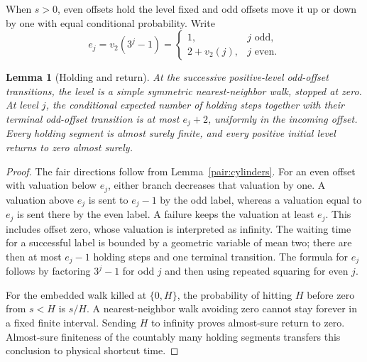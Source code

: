 \documentclass[11pt]{amsart}
\newtheorem{lemma}[theorem]{Lemma}
\theoremstyle{definition}
\theoremstyle{remark}
\begin{document}
When $s>0$, even offsets hold the level fixed and odd offsets move it up or
down by one with equal conditional probability.  Write
\begin{equation}\label{pair:valuation}
 e_j=v_2(3^j-1)=
 \begin{cases}1,&j\text{ odd},\\2+v_2(j),&j\text{ even}.
 \end{cases}
\end{equation}

\begin{lemma}[Holding and return]\label{pair:holding}
At the successive positive-level odd-offset transitions, the level is a
simple symmetric nearest-neighbor walk, stopped at zero.  At level $j$,
the conditional expected number of holding steps together with their
terminal odd-offset transition is at most $e_j+2$, uniformly in the
incoming offset.  Every holding segment is almost surely finite, and every
positive initial level returns to zero almost surely.
\end{lemma}
\begin{proof}
The fair directions follow from Lemma~\ref{pair:cylinders}.  For an even
offset with valuation below $e_j$, either branch decreases that valuation
by one.  A valuation above $e_j$ is sent to $e_j-1$ by the odd label,
whereas a valuation equal to $e_j$ is sent there by the even label.  A
failure keeps the valuation at least $e_j$.  This includes offset zero,
whose valuation is interpreted as infinity.  The waiting time for a
successful label is bounded by a geometric variable of mean two; there
are then at most $e_j-1$ holding steps and one terminal transition.
The formula for $e_j$ follows by factoring $3^j-1$ for odd $j$ and then
using repeated squaring for even $j$.

For the embedded walk killed at $\{0,H\}$, the probability of hitting
$H$ before zero from $s<H$ is $s/H$.  A nearest-neighbor walk avoiding
zero cannot stay forever in a fixed finite interval.  Sending $H$ to
infinity proves almost-sure return to zero.  Almost-sure finiteness of
the countably many holding segments transfers this conclusion to physical
shortcut time.
\end{proof}
\end{document}
